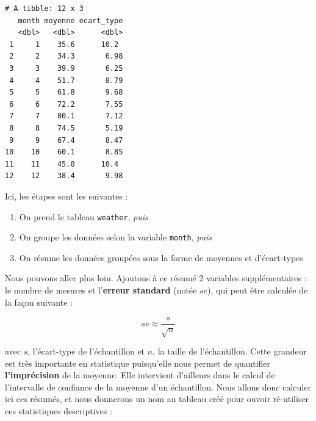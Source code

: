 \documentclass[a4paperpaper,]{article}
\newenvironment{Shaded}{\begin{snugshade}}{\end{snugshade}}
\newcommand{\DataTypeTok}[1]{\textcolor[rgb]{0.00,0.34,0.68}{#1}}
\newcommand{\KeywordTok}[1]{\textcolor[rgb]{0.12,0.11,0.11}{\textbf{#1}}}
\newcommand{\NormalTok}[1]{\textcolor[rgb]{0.12,0.11,0.11}{#1}}
\newcommand{\OperatorTok}[1]{\textcolor[rgb]{0.12,0.11,0.11}{#1}}
\newcommand{\OtherTok}[1]{\textcolor[rgb]{0.00,0.43,0.16}{#1}}
\newcommand{\StringTok}[1]{\textcolor[rgb]{0.75,0.01,0.01}{#1}}
\providecommand{\tightlist}{%
  \setlength{\itemsep}{0pt}\setlength{\parskip}{0pt}}
\begin{document}
\begin{Shaded}
\end{Shaded}

\begin{verbatim}
# A tibble: 12 x 3
   month moyenne ecart_type
   <dbl>   <dbl>      <dbl>
 1     1    35.6      10.2 
 2     2    34.3       6.98
 3     3    39.9       6.25
 4     4    51.7       8.79
 5     5    61.8       9.68
 6     6    72.2       7.55
 7     7    80.1       7.12
 8     8    74.5       5.19
 9     9    67.4       8.47
10    10    60.1       8.85
11    11    45.0      10.4 
12    12    38.4       9.98
\end{verbatim}

Ici, les étapes sont les suivantes :

\begin{enumerate}
\def\labelenumi{\arabic{enumi}.}
\tightlist
\item
  On prend le tableau \texttt{weather}, \emph{puis}
\item
  On groupe les données selon la variable \texttt{month}, \emph{puis}
\item
  On résume les données groupées sous la forme de moyennes et d'écart-types
\end{enumerate}

Nous pouvons aller plus loin. Ajoutons à ce résumé 2 variables supplémentaires : le nombre de mesures et l'\textbf{erreur standard} (notée \(se\)), qui peut être calculée de la façon suivante :

\[se \approx \frac{s}{\sqrt{n}}\]

avec \(s\), l'écart-type de l'échantillon et \(n\), la taille de l'échantillon. Cette grandeur est très importante en statistique puisqu'elle nous permet de quantifier \textbf{l'imprécision} de la moyenne. Elle intervient d'ailleurs dans le calcul de l'intervalle de confiance de la moyenne d'un échantillon. Nous allons donc calculer ici ces résumés, et nous donnerons un nom au tableau créé pour ouvoir ré-utiliser ces statistiques descriptives :
\end{document}
